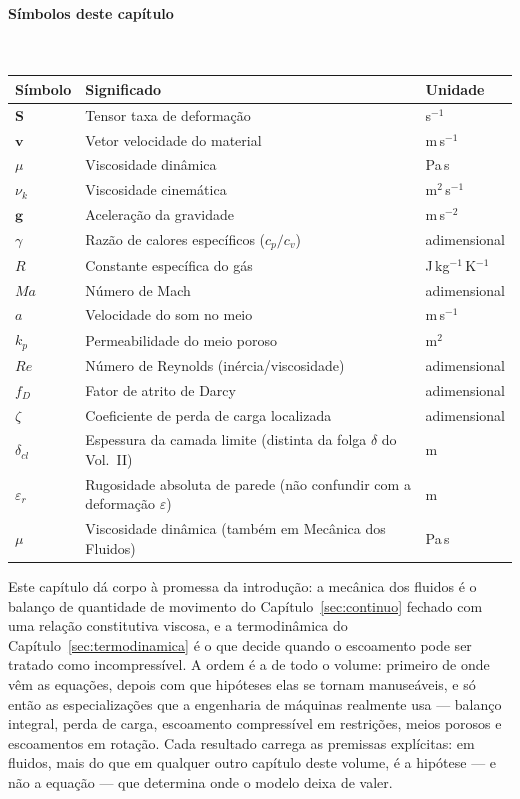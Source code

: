 \documentclass[12pt,a4paper]{article}
\numberwithin{equation}{section}
\numberwithin{table}{section}
\numberwithin{figure}{section}
\begin{document}
\paragraph{Símbolos deste capítulo}\mbox{}\\[-0.5em]
{\small
\begin{longtable}{>{\raggedright\arraybackslash}p{2.6cm} >{\raggedright\arraybackslash}p{9.2cm} >{\raggedright\arraybackslash}p{2.6cm}}
	\toprule
	\textbf{Símbolo} & \textbf{Significado} & \textbf{Unidade} \\ \midrule
	\endhead
	$\mathbf{S}$ & Tensor taxa de deformação & s$^{-1}$ \\
	$\mathbf{v}$ & Vetor velocidade do material & m\,s$^{-1}$ \\
	$\mu$ & Viscosidade dinâmica & Pa\,s \\
	$\nu_k$ & Viscosidade cinemática & m$^2$\,s$^{-1}$ \\
	$\mathbf{g}$ & Aceleração da gravidade & m\,s$^{-2}$ \\
	$\gamma$ & Razão de calores específicos ($c_p/c_v$) & adimensional \\
	$R$ & Constante específica do gás & J\,kg$^{-1}$\,K$^{-1}$ \\
	$Ma$ & Número de Mach & adimensional \\
	$a$ & Velocidade do som no meio & m\,s$^{-1}$ \\
	$k_p$ & Permeabilidade do meio poroso & m$^2$ \\
	$Re$ & Número de Reynolds (inércia/viscosidade) & adimensional \\
	$f_D$ & Fator de atrito de Darcy & adimensional \\
	$\zeta$ & Coeficiente de perda de carga localizada & adimensional \\
	$\delta_{cl}$ & Espessura da camada limite (distinta da folga $\delta$ do Vol.~II) & m \\
	$\varepsilon_r$ & Rugosidade absoluta de parede (não confundir com a deformação $\varepsilon$) & m \\
	$\mu$ & Viscosidade dinâmica (também em Mecânica dos Fluidos) & Pa\,s \\
	\bottomrule
\end{longtable}
}




Este capítulo dá corpo à promessa da introdução: a mecânica dos fluidos é o
balanço de quantidade de movimento do Capítulo~\ref{sec:continuo} fechado com
uma relação constitutiva viscosa, e a termodinâmica do
Capítulo~\ref{sec:termodinamica} é o que decide quando o escoamento pode ser
tratado como incompressível. A ordem é a de todo o volume: primeiro de onde
vêm as equações, depois com que hipóteses elas se tornam manuseáveis, e só
então as especializações que a engenharia de máquinas realmente usa --- balanço
integral, perda de carga, escoamento compressível em restrições, meios porosos
e escoamentos em rotação. Cada resultado carrega as premissas explícitas: em
fluidos, mais do que em qualquer outro capítulo deste volume, é a hipótese ---
e não a equação --- que determina onde o modelo deixa de valer.
\end{document}
